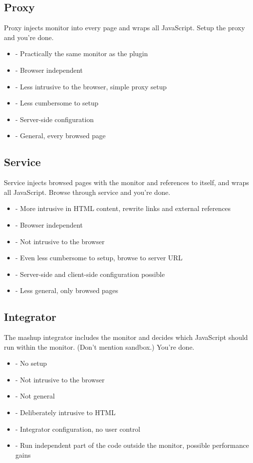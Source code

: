 \documentclass{llncs}
\begin{document}
\subsection{Proxy}

Proxy injects monitor into every page and wraps all JavaScript. Setup the proxy 
and you're done.
\begin{itemize}
\item- Practically the same monitor as the plugin
\item- Browser independent
\item- Less intrusive to the browser, simple proxy setup
\item- Less cumbersome to setup
\item- Server-side configuration
\item- General, every browsed page
\end{itemize}

\subsection{Service}

Service injects browsed pages with the monitor and references to itself, and 
wraps all JavaScript. Browse through service and you're done.
\begin{itemize}
\item- More intrusive in HTML content, rewrite links and external references 
\item- Browser independent
\item- Not intrusive to the browser
\item- Even less cumbersome to setup, browse to server URL
\item- Server-side and client-side configuration possible
\item- Less general, only browsed pages
\end{itemize}

\subsection{Integrator}

The mashup integrator includes the monitor and decides which JavaScript should 
run within the monitor. (Don't mention sandbox.) You're done.
\begin{itemize}
\item- No setup
\item- Not intrusive to the browser
\item- Not general
\item- Deliberately intrusive to HTML
\item- Integrator configuration, no user control
\item- Run independent part of the code outside the monitor, possible performance gains
\end{itemize}
\end{document}
